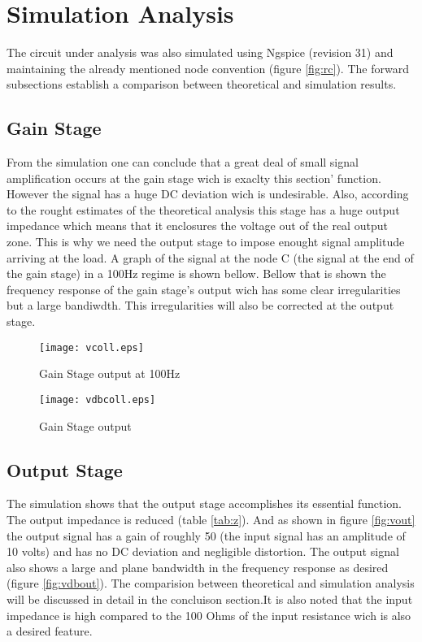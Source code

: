 \section{Simulation Analysis}
\label{sec:simulation}

The circuit under analysis was also simulated using Ngspice (revision 31) and maintaining the already mentioned node convention (figure \ref{fig:rc}). The forward subsections establish a comparison between theoretical and simulation results.

\subsection{Gain Stage}
From the simulation one can conclude that a great deal of small signal amplification occurs at the gain stage wich is exaclty this section' function. However the signal has a huge DC deviation wich is undesirable. Also, according to the rought estimates of the theoretical analysis this stage has a huge output impedance which means that it enclosures the voltage out of the real output zone. This is why we need the output stage to impose enought signal amplitude arriving at the load. A graph of the signal at the node C (the signal at the end of the gain stage) in a 100Hz regime is shown bellow. Bellow that is shown the frequency response of the gain stage's output wich has some clear irregularities but a large bandiwdth. This irregularities will also be corrected at the output stage.

\begin{figure}[h] \centering
\texttt{[image: vcoll.eps]}
\vspace{-5mm}
\caption{Gain Stage output at 100Hz}
\label{fig:vcoll}
\end{figure}

\begin{figure}[h] \centering
\texttt{[image: vdbcoll.eps]}
\vspace{-5mm}
\caption{Gain Stage output }
\label{fig:vdbcoll}
\end{figure}

\newpage
\subsection{Output Stage}
The simulation shows that the output stage accomplishes its essential function. The output impedance is reduced (table \ref{tab:z}). And as shown in figure \ref{fig:vout} the output signal has a gain of roughly 50 (the input signal has an amplitude of 10 volts) and has no DC deviation and negligible distortion. The output signal also shows a large and plane bandwidth in the frequency response as desired (figure \ref{fig:vdbout}). The comparision between theoretical and simulation analysis will be discussed in detail in the concluison section.It is also noted that the input impedance is high compared to the 100 Ohms of the input resistance wich is also a desired feature.


